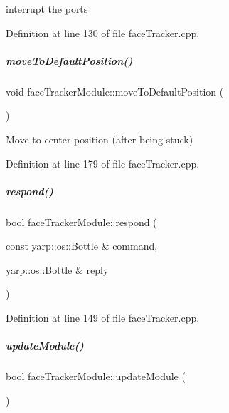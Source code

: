 interrupt the ports 



Definition at line 130 of file face\+Tracker.\+cpp.

\mbox{\label{group__faceTracker_a3e4e9e96b70d461306b5fce25fb4798c}} 
\subparagraph{\texorpdfstring{move\+To\+Default\+Position()}{moveToDefaultPosition()}}
{\footnotesize\ttfamily void face\+Tracker\+Module\+::move\+To\+Default\+Position (\begin{DoxyParamCaption}{ }\end{DoxyParamCaption})\hspace{0.3cm}{\ttfamily [protected]}}



Move to center position (after being stuck) 



Definition at line 179 of file face\+Tracker.\+cpp.

\mbox{\label{group__faceTracker_a79c16b996d3ea3492323897544085f0a}} 
\subparagraph{\texorpdfstring{respond()}{respond()}}
{\footnotesize\ttfamily bool face\+Tracker\+Module\+::respond (\begin{DoxyParamCaption}\item[{const yarp\+::os\+::\+Bottle \&}]{command,  }\item[{yarp\+::os\+::\+Bottle \&}]{reply }\end{DoxyParamCaption})}



Definition at line 149 of file face\+Tracker.\+cpp.

\mbox{\label{group__faceTracker_a3b4f7abdfcc1c9661c8e8b06d6454bcc}} 
\subparagraph{\texorpdfstring{update\+Module()}{updateModule()}}
{\footnotesize\ttfamily bool face\+Tracker\+Module\+::update\+Module (\begin{DoxyParamCaption}{ }\end{DoxyParamCaption})}



